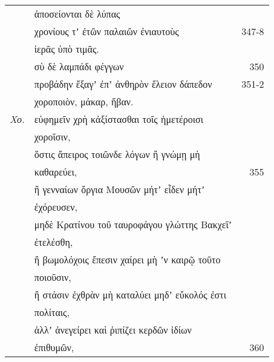 \documentclass[13pt]{article}
\begin{document}
\begin{greek}
\newpage
\begin{spacing}{1.5}
\begin{tabularx}{\textwidth}{@{}lXr@{}}
& ἀποσείονται δὲ λύπας &  \\
& χρονίους τʼ ἐτῶν παλαιῶν ἐνιαυτοὺς & 347-8 \\
& ἱερᾶς ὑπὸ τιμᾶς. & \\
& σὺ δὲ λαμπάδι φέγγων & 350 \\
& προβάδην ἔξαγʼ ἐπʼ ἀνθηρὸν ἕλειον δάπεδον & 351-2 \\
& χοροποιὸν, μάκαρ, ἥβαν. &  \\
\textit{Χο.} & εὐφημεῖν χρὴ κἀξίστασθαι τοῖς ἡμετέροισι  & \\
& \hspace{3em}χοροῖσιν, &\\
& ὅστις ἄπειρος τοιῶνδε λόγων ἢ γνώμῃ μὴ &\\
& \hspace{3em}καθαρεύει, & 355 \\
& ἢ γενναίων ὄργια Μουσῶν μήτʼ εἶδεν μήτʼ &  \\
& \hspace{3em}ἐχόρευσεν, & \\
& μηδὲ Κρατίνου τοῦ ταυροφάγου γλώττης Βακχεῖʼ &  \\
&\hspace{3em}ἐτελέσθη, & \\
& ἢ βωμολόχοις ἔπεσιν χαίρει μὴ ʼν καιρῷ τοῦτο &  \\
&\hspace{3em}ποιοῦσιν, & \\
& ἢ στάσιν ἐχθρὰν μὴ καταλύει μηδʼ εὔκολός ἐστι &  \\
&\hspace{3em} πολίταις, &\\ 
& ἀλλʼ ἀνεγείρει καὶ ῥιπίζει κερδῶν ἰδίων & \\
& \hspace{3em}ἐπιθυμῶν, & 360 \\

\end{tabularx}
\end{spacing}


\end{greek}
\end{document}
